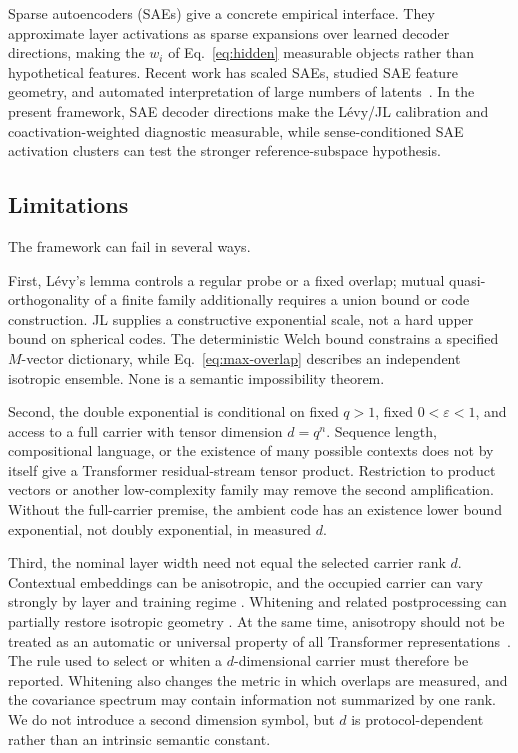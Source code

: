\documentclass[
  aps,
  reprint,
  superscriptaddress,
  floatfix,
  nofootinbib,
  longbibliography
]{revtex4-2}
\newcommand{\Msem}{M}
\begin{document}
Sparse autoencoders (SAEs) give a concrete empirical interface. They
approximate layer activations as sparse expansions over learned decoder
directions, making the $w_i$ of Eq.~\eqref{eq:hidden} measurable
objects rather than hypothetical features. Recent work has scaled SAEs,
studied SAE feature geometry, and automated interpretation of large
numbers of latents~\cite{gao2025scaling,li2025geometry,paulo2025automatically,shu2025survey}. In the
present framework, SAE decoder directions make the L\'evy/JL calibration and
coactivation-weighted diagnostic measurable, while sense-conditioned SAE
activation clusters can test the stronger reference-subspace hypothesis.

\subsection{Limitations}
\label{sec:limitations}

The framework can fail in several ways.

First, L\'evy's lemma controls a regular probe or a fixed overlap; mutual
quasi-orthogonality of a finite family additionally requires a union bound or
code construction.  JL supplies a constructive exponential scale, not a hard
upper bound on spherical codes.  The deterministic Welch bound constrains a
specified $\Msem$-vector dictionary, while Eq.~\eqref{eq:max-overlap} describes
an independent isotropic ensemble.  None is a semantic impossibility theorem.

Second, the double exponential is conditional on fixed $q>1$, fixed
$0<\varepsilon<1$, and access to a full carrier with tensor dimension
$d=q^n$.  Sequence length, compositional language, or the existence of many
possible contexts does not by itself give a Transformer residual-stream tensor
product.  Restriction to product vectors or another low-complexity family may
remove the second amplification.  Without the full-carrier premise, the
ambient code has an existence lower bound exponential, not doubly
exponential, in measured $d$.

Third, the nominal layer width need not equal the selected carrier rank $d$.
Contextual embeddings can be anisotropic, and the occupied carrier can vary
strongly by layer and training regime
\cite{ethayarajh2019,gao2019representation,mu2018allbutthetop,razzhigaev2024shape}. Whitening and
related postprocessing can partially restore isotropic geometry
\cite{gao2019representation,mu2018allbutthetop,su2021whitening}. At the same time, anisotropy should not
be treated as an automatic or universal property of all Transformer
representations~\cite{machina2024anisotropy}. The rule used to select or
whiten a $d$-dimensional carrier must therefore be reported. Whitening also
changes the metric in which overlaps are measured, and the covariance spectrum
may contain information not summarized by one rank. We do not introduce a
second dimension symbol, but $d$ is protocol-dependent rather than an
intrinsic semantic constant.
\end{document}
